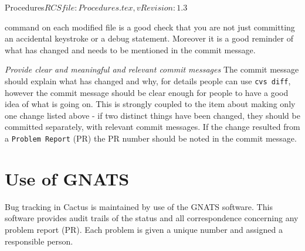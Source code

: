 \begin{cactuspart}{2}{Procedures}{$RCSfile: Procedures.tex,v $}{$Revision: 1.3 $}
\begin{Lentry}
command on each modified file is a good check that you are not just
committing an accidental keystroke or a debug statement.  Moreover it
is a good reminder of what has changed and needs to be mentioned in
the commit message.
\item[{\em Provide clear and meaningful and relevant commit messages}]
The commit message should explain what has changed and why, for
details people can use {\tt \verb.cvs diff.}, however the commit
message should be clear enough for people to have a good idea of what
is going on.  This is strongly coupled to the item about making only
one change listed above - if two distinct things have been changed,
they should be committed separately, with relevant commit messages.
If the change resulted from a {\tt Problem Report} (PR) the PR number
should be noted in the commit message.
\end{Lentry}


\chapter{Use of GNATS}

Bug tracking in Cactus is maintained by use of the GNATS software.
This software provides audit trails of the status and all
correspondence concerning any problem report (PR).  Each problem is
given a unique number and assigned a responsible person.


\end{cactuspart}
